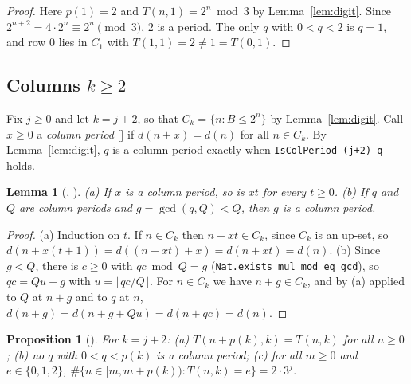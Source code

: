 \documentclass[11pt]{amsart}
\theoremstyle{plain}
\newtheorem{lemma}[theorem]{Lemma}
\newtheorem{proposition}[theorem]{Proposition}
\theoremstyle{definition}
\begin{document}
\begin{proof}
Here $p(1)=2$ and $T(n,1)=2^n\bmod 3$ by Lemma~\ref{lem:digit}. Since $2^{n+2}=4\cdot2^n\equiv2^n\pmod3$, $2$ is a period. The only $q$ with $0<q<2$ is $q=1$, and row $0$ lies in $C_1$ with $T(1,1)=2\ne1=T(0,1)$.
\end{proof}

\subsection{Columns \texorpdfstring{$k\ge2$}{k >= 2}}
Fix $j\ge0$ and let $k=j+2$, so that $C_k=\{n: B\le 2^n\}$ by Lemma~\ref{lem:digit}. Call $x\ge0$ a \emph{column period} [] if $d(n+x)=d(n)$ for all $n\in C_k$. By Lemma~\ref{lem:digit}, $q$ is a column period exactly when \texttt{IsColPeriod (j+2) q} holds.

\begin{lemma}[, ]\label{lem:per}
(a) If $x$ is a column period, so is $xt$ for every $t\ge0$.
(b) If $q$ and $Q$ are column periods and $g=\gcd(q,Q)<Q$, then $g$ is a column period.
\end{lemma}

\begin{proof}
(a) Induction on $t$. If $n\in C_k$ then $n+xt\in C_k$, since $C_k$ is an up-set, so $d(n+x(t+1))=d((n+xt)+x)=d(n+xt)=d(n)$.
(b) Since $g<Q$, there is $c\ge0$ with $qc\bmod Q=g$ (\texttt{Nat.exists\_mul\_mod\_eq\_gcd}), so $qc=Qu+g$ with $u=\lfloor qc/Q\rfloor$. For $n\in C_k$ we have $n+g\in C_k$, and by (a) applied to $Q$ at $n+g$ and to $q$ at $n$,
$d(n+g)=d(n+g+Qu)=d(n+qc)=d(n)$.
\end{proof}

\begin{proposition}[]\label{prop:ge2}
For $k=j+2$:
(a) $T(n+p(k),k)=T(n,k)$ for all $n\ge0$;
(b) no $q$ with $0<q<p(k)$ is a column period;
(c) for all $m\ge0$ and $e\in\{0,1,2\}$, $\#\{n\in[m,m+p(k)): T(n,k)=e\}=2\cdot3^j$.
\end{proposition}
\end{document}
